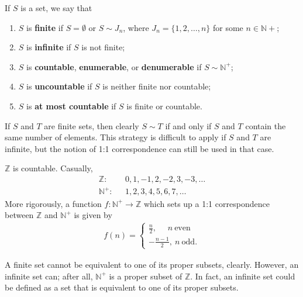 \documentclass[12pt]{article}
\begin{document}
\begin{defn}
  If $S$ is a set, we say that
  \begin{enumerate}
    \item
      $S$ is \textbf{finite} if $S = \emptyset$ or $S \sim J_n$, where $J_n =
      \{1,2,\ldots,n\}$ for some $n \in \mathbb{N}+$;
    \item
      $S$ is \textbf{infinite} if $S$ is not finite;
    \item
      $S$ is \textbf{countable}, \textbf{enumerable}, or \textbf{denumerable} if $S
      \sim \mathbb{N}^+$;
    \item
      $S$ is \textbf{uncountable} if $S$ is neither finite nor countable;
    \item
      $S$ is \textbf{at most countable} if $S$ is finite or countable.
  \end{enumerate}
\end{defn}

\begin{comm}
  If $S$ and $T$ are finite sets, then clearly $S \sim T$ if and only if $S$ and $T$
  contain the same number of elements. This strategy is difficult to apply if $S$ and
  $T$ are infinite, but the notion of 1:1 correspondence can still be used in that
  case.
\end{comm}

\begin{exm}
  $\mathbb{Z}$ is countable. Casually,
  \begin{align*}
    \mathbb{Z}:&\ \ \ 0,1,-1,2,-2,3,-3,\ldots\\
    \mathbb{N}^+:&\ \ \ 1,2,3,4,5,6,7,\ldots
  \end{align*}
  More rigorously, a function $f: \mathbb{N}^+ \to \mathbb{Z}$ which sets up a 1:1
  correspondence between $\mathbb{Z}$ and $\mathbb{N}^+$ is given by
  \begin{align*}
    f(n) =
    \begin{cases}
      \frac{n}{2},\ \ \ \ \ \ n\ \text{even}\\
      -\frac{n-1}{2},\ n\ \text{odd}.
    \end{cases}
  \end{align*}
\end{exm}

\begin{comm}
  A finite set cannot be equivalent to one of its proper subsets, clearly. However,
  an infinite set can; after all, $\mathbb{N}^+$ is a proper subset of $\mathbb{Z}$.
  In fact, an infinite set could be defined as a set that is equivalent to one of its
  proper subsets.
\end{comm}
\end{document}

